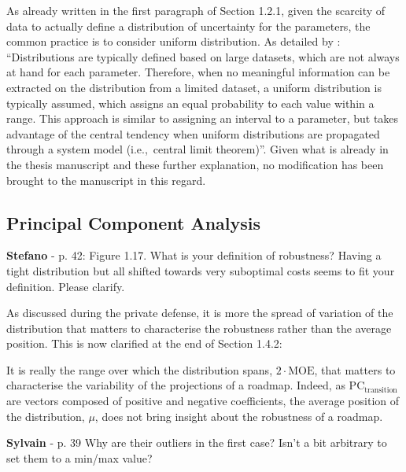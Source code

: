 \documentclass[12pt,a4paper]{article}
\def\ie{i.e.,\ }
\begin{document}
\noindent As already written in the first paragraph of Section 1.2.1, given the scarcity of data to actually define a distribution of uncertainty for the parameters, the common practice is to consider uniform distribution. As detailed by \citet{coppittersthesis}: ``Distributions are typically defined based on large datasets, which are not always at hand for each parameter. Therefore, when no meaningful information can be extracted on the distribution from a limited dataset, a uniform distribution is typically assumed, which assigns an equal probability to each value within a range. This approach is similar to assigning an interval to a parameter, but takes advantage of the central tendency when uniform distributions are propagated through a system model (\ie central limit theorem)''. Given what is already in the thesis manuscript and these further explanation, no modification has been brought to the manuscript in this regard. 

\subsection{Principal Component Analysis}
\label{methodo_PCA}

\begin{mdframed}[style=comment] %
{\color{orange} \textbf{Stefano}} - p. 42: Figure 1.17. What is your definition of robustness? Having a tight distribution but all shifted towards very suboptimal costs seems to fit your definition. Please clarify.
\end{mdframed}

\noindent As discussed during the private defense, it is more the spread of variation of the distribution that matters to characterise the robustness rather than the average position. This is now clarified {\color{blue}at the end of Section 1.4.2}:

\begin{mdframed}[style=manuscript] %
It is really the range over which the distribution spans, $2\cdot \mathrm{MOE}$, that matters to characterise the variability of the projections of a roadmap. Indeed, as $\text{PC}_{\text{transition}}$ are vectors composed of positive and negative coefficients, the average position of the distribution, $\mu$, does not bring insight about the robustness of a roadmap.
\end{mdframed}

\begin{mdframed}[style=comment] %
{\color{purple} \textbf{Sylvain}} - p. 39 Why are their outliers in the first case? Isn't a bit arbitrary to set them to a min/max value?
\end{mdframed}
\end{document}
